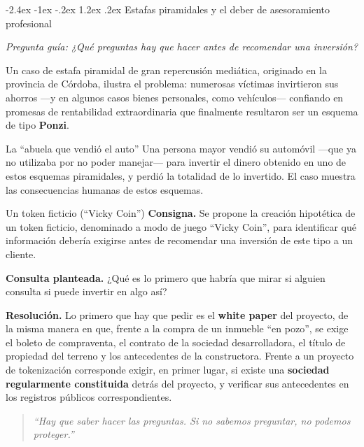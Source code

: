 \documentclass[12pt,oneside]{book}
\makeatletter
\renewcommand\section{\@startsection{section}{1}{\z@}%
  {-2.4ex \@plus -1ex \@minus -.2ex}%
  {1.2ex \@plus .2ex}%
  {\normalfont\Large\bfseries\color{blue!50!black}}}
\newcommand{\guia}[1]{\noindent\textit{Pregunta guía: #1}\par\smallskip}
\makeatother
\begin{document}
\section{Estafas piramidales y el deber de asesoramiento profesional}

\guia{¿Qué preguntas hay que hacer antes de recomendar una inversión?}

Un caso de estafa piramidal de gran repercusión mediática, originado en la provincia de Córdoba, ilustra el problema: numerosas víctimas invirtieron sus ahorros ---y en algunos casos bienes personales, como vehículos--- confiando en promesas de rentabilidad extraordinaria que finalmente resultaron ser un esquema de tipo \textbf{Ponzi}.

\begin{example}{La ``abuela que vendió el auto''}
Una persona mayor vendió su automóvil ---que ya no utilizaba por no poder manejar--- para invertir el dinero obtenido en uno de estos esquemas piramidales, y perdió la totalidad de lo invertido. El caso muestra las consecuencias humanas de estos esquemas.
\end{example}

\begin{exercise}{Un token ficticio (``Vicky Coin'')}
\textbf{Consigna.} Se propone la creación hipotética de un token ficticio, denominado a modo de juego ``Vicky Coin'', para identificar qué información debería exigirse antes de recomendar una inversión de este tipo a un cliente.

\textbf{Consulta planteada.} ¿Qué es lo primero que habría que mirar si alguien consulta si puede invertir en algo así?

\textbf{Resolución.} Lo primero que hay que pedir es el \textbf{white paper} del proyecto, de la misma manera en que, frente a la compra de un inmueble ``en pozo'', se exige el boleto de compraventa, el contrato de la sociedad desarrolladora, el título de propiedad del terreno y los antecedentes de la constructora. Frente a un proyecto de tokenización corresponde exigir, en primer lugar, si existe una \textbf{sociedad regularmente constituida} detrás del proyecto, y verificar sus antecedentes en los registros públicos correspondientes.
\end{exercise}

\begin{quote}
\textit{``Hay que saber hacer las preguntas. Si no sabemos preguntar, no podemos proteger.''}
\end{quote}
\end{document}
